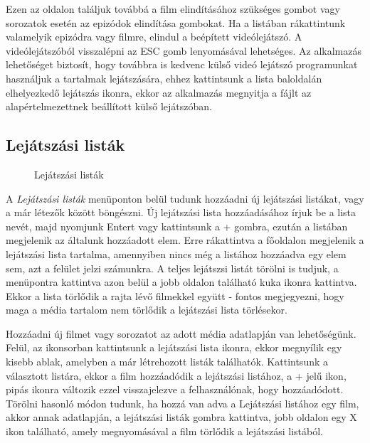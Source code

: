 Ezen az oldalon találjuk továbbá a film elindításához szükséges gombot vagy sorozatok esetén az epizódok elindítása gombokat. Ha a listában rákattintunk valamelyik epizódra vagy filmre, elindul a beépített videólejátszó. A videólejátszóból visszalépni az ESC gomb lenyomásával lehetséges. Az alkalmazás lehetőséget biztosít, hogy továbbra is kedvenc külső videó lejátszó programunkat használjuk a tartalmak lejátszására, ehhez kattintsunk a lista baloldalán elhelyezkedő lejátszás ikonra, ekkor az alkalmazás megnyitja a fájlt az alapértelmezettnek beállított külső lejátszóban.

\subsection{Lejátszási listák}
\begin{figure}[H]
	\centering
	\hspace{5pt}
	\caption{Lejátszási listák}
	\label{fig:playlists}
\end{figure}
A {\it Lejátszási listák} menüponton belül tudunk hozzáadni új lejátszási listákat, vagy a már létezők között böngészni. Új lejátszási lista hozzáadásához írjuk be a lista nevét, majd nyomjunk Entert vagy kattintsunk a + gombra, ezután a listában megjelenik az általunk hozzáadott elem. Erre rákattintva a főoldalon megjelenik a lejátszási lista tartalma, amennyiben nincs még a listához hozzáadva egy elem sem, azt a felület jelzi számunkra. A teljes lejátszsi listát törölni is tudjuk, a menüpontra kattintva azon belül a jobb oldalon található kuka ikonra kattintva. Ekkor a lista törlődik a rajta lévő filmekkel együtt - fontos megjegyezni, hogy maga a média tartalom nem törlődik a lejátszási lista törlésekor.

Hozzáadni új filmet vagy sorozatot az adott média adatlapján van lehetőségünk. Felül, az ikonsorban kattintsunk a lejátszási lista ikonra, ekkor megnyílik egy kisebb ablak, amelyben a már létrehozott listák találhatók. Kattintsunk a választott listára, ekkor a film hozzáadódik a lejátszási listához, a + jelű ikon, pipás ikonra változik ezzel visszajelezve a felhasználónak, hogy hozzáadódott. Törölni hasonló módon tudunk, ha hozzá van adva a Lejátszási listához egy film, akkor annak adatlapján, a lejátszási listák gombra kattintva, jobb oldalon egy X ikon található, amely megnyomásával a film törlődik a lejátszási listából.


